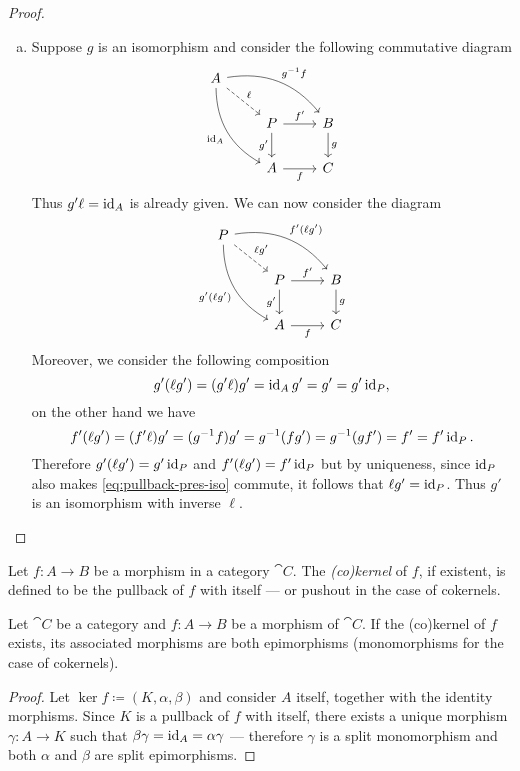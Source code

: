 \begin{proof}
\begin{enumerate}[(a)]
\item Suppose \(g\) is an isomorphism and consider the following commutative
  diagram
  \[
  \begin{tikzcd}
  A \ar[rrd, "g^{-1} f", bend left]
  \ar[drd, "\Id_{A}"', bend right]
  \ar[rd, "\ell", dashed]
  & &
  \\
  &P \ar[r, "f'"] \ar[d, "g'"']
  &B \ar[d, "g"]
  \\
  &A \ar[r, "f"'] &C
  \end{tikzcd}
  \]
  Thus \(g' \ell = \operatorname{id}_A\) is already given. We can now consider the diagram
  \begin{equation}\label{eq:pullback-pres-iso}
  \begin{tikzcd}
  P \ar[rrd, "f' (\ell g')", bend left]
  \ar[drd, "g' (\ell g')"', bend right]
  \ar[rd, "\ell g'", dashed]
  & &
  \\
  &P \ar[r, "f'"] \ar[d, "g'"']
  &B \ar[d, "g"]
  \\
  &A \ar[r, "f"'] &C
  \end{tikzcd}
  \end{equation}
  Moreover, we consider the following composition
  \[
  g' (\ell g') = (g' \ell) g' = \operatorname{id}_A g' = g' = g' \operatorname{id}_P,
  \]
  on the other hand we have
  \[
  f' (\ell g') = (f' \ell) g'
  = (g^{-1} f) g' = g^{-1} (f g')
  = g^{-1} (g f') = f' = f' \operatorname{id}_P.
  \]
  Therefore \(g' (\ell g') = g' \operatorname{id}_P\) and \(f' (\ell g') = f' \operatorname{id}_P\) but by
  uniqueness, since \(\operatorname{id}_P\) also makes \cref{eq:pullback-pres-iso} commute, it
  follows that \(\ell g' = \operatorname{id}_P\). Thus \(g'\) is an isomorphism with inverse
  \(\ell\).
\end{enumerate}
\end{proof}

\begin{definition}
\label{def:kernel-cokernel}
Let \(f: A \to B\) be a morphism in a category \(\cat C\). The \emph{(co)kernel}
of \(f\), if existent, is defined to be the pullback of \(f\) with itself --- or
pushout in the case of cokernels.
\end{definition}

\begin{proposition}
\label{prop:morphisms-kernel-cokernel}
Let \(\cat C\) be a category and \(f: A \to B\) be a morphism of \(\cat C\). If
the (co)kernel of \(f\) exists, its associated morphisms are both epimorphisms
(monomorphisms for the case of cokernels).
\end{proposition}

\begin{proof}
Let \(\ker f \coloneq (K, \alpha, \beta)\) and consider \(A\) itself, together
with the identity morphisms. Since \(K\) is a pullback of \(f\) with itself,
there exists a unique morphism \(\gamma: A \to K\) such that \(\beta \gamma =
\operatorname{id}_A = \alpha \gamma\) --- therefore \(\gamma\) is a split monomorphism and
both \(\alpha\) and \(\beta\) are split epimorphisms.
\end{proof}

